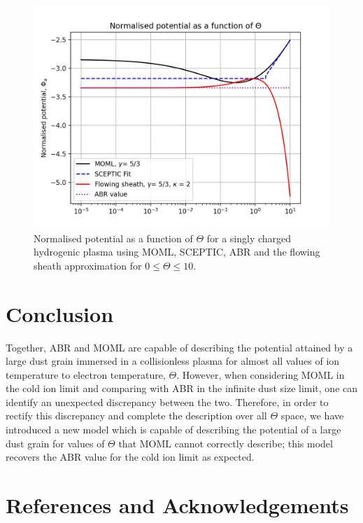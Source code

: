 \documentclass{article}
\begin{document}
\begin{figure}[H]
\centering
\includegraphics[width=\linewidth]{Output/ModelComparions.jpeg}
\caption{Normalised potential as a function of $\Theta$ for a singly charged hydrogenic plasma using MOML, SCEPTIC,
ABR and the flowing sheath approximation for $0 \leq \Theta \leq 10$.}
\label{ModelComparions} 
\end{figure}

\section{Conclusion}

Together, ABR and MOML are capable of describing the 
potential attained by a large dust grain immersed in a collisionless plasma
for almost all values of ion temperature to electron temperature, $\Theta$. 
However, when considering MOML in the cold 
ion limit and comparing with ABR in the infinite dust size limit, one can identify an 
unexpected discrepancy between the two. Therefore, in order to rectify this 
discrepancy and complete the description over all $\Theta$ space, we have introduced a new model 
which is capable of describing the potential of a large dust grain for values 
of $\Theta$ that MOML cannot correctly describe; this model recovers 
the ABR value for the cold ion limit as expected.

\section{References and Acknowledgements}


\end{document}
